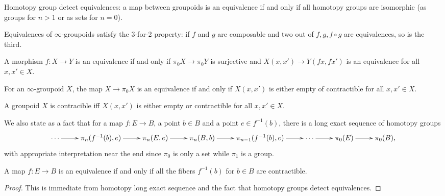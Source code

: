 Homotopy group detect equivalences:
a map between groupoids is an equivalence
if and only if all homotopy groups
are isomorphic (as groups for $n>1$ or
as sets for $n=0$).

\begin{lemma}
\label{lemma-equivalences-satisfy-3-for-2}
Equivalences of $\infty$-groupoids
satisfy the 3-for-2 property:
if  $f$ and $g$ are composable and two
out of $f,g,f \circ g$ are equivalences,
so is the third.
\end{lemma}

\begin{lemma}
\label{lemma-equivalence-iff-equivalence-on-path-spaces}
A morphism $f:X\to Y$ is an equivalence if and only if
$\pi_0 X \to \pi_0Y$ is surjective
and $X(x,x') \to Y(fx,fx')$ is an equivalence
for all $x,x' \in X$.
\end{lemma}

\begin{lemma}
\label{lemma-equivalence-iff-path-spaces-are-contractible}
For an  $\infty$-groupoid $X$,
the map $X \to \pi_0X$ is an equivalence if and only if
$X(x,x')$ is either empty of contractible for all $x,x' \in X$.
\end{lemma}

\begin{lemma}
\label{lemma-groupoid-is-contractible-iff-path-spaces-are-contractible}
A groupoid $X$ is contracible iff $X(x,x')$ is either empty or
contractible for all $x,x' \in X$.
\end{lemma}

\medskip\noindent
We also state as a fact that
for a map $f:E \to B$, a point $b \in B$ and a point $e \in f^{-1}(b)$,
there is a long exact sequence of homotopy groups
$$
\xymatrix{
\cdots\ar[r]&\pi_n(f^{-1}(b),e)\ar[r]&
\pi_n(E,e)\ar[r]&\pi_n(B,b)\ar[r]&
\pi_{n-1}(f^{-1}(b),e)\ar[r]&\cdots
\ar[r]&\pi_0(E)\ar[r]&\pi_0(B),
}
$$
with appropriate interpretation near the end since
$\pi_0$ is only a set while $\pi_1$ is a group.

\begin{proposition}
\label{proposition-map-is-equivalence-iff-fibers-contractible}
A map $f:E \to B$ is an equivalence if and only if
all the fibers $f^{-1}(b)$ for $b \in B$ are contractible.
\end{proposition}

\begin{proof}
This is immediate from homotopy long exact sequence
and the fact that homotopy groups detect equivalences.
\end{proof}

